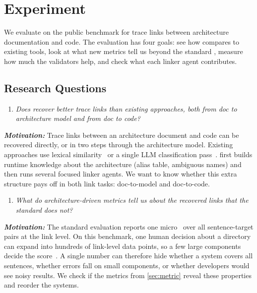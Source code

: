 \section{Experiment}
\label{sec:experiment}

We evaluate \approach{} on the public benchmark for trace links between architecture documentation and code.
The evaluation has four goals: see how \approach{} compares to existing tools, look at what new metrics tell us beyond the standard \fone, measure how much the validators help, and check what each linker agent contributes.

\subsection{Research Questions}
\label{sec:rqs}

\begin{enumerate}[leftmargin=*, labelindent=0em, label=\textbf{RQ\arabic*}:, ref=RQ\arabic*, series=researchQuestions]
    \item \label{RQ1 SOTA comparison} \emph{Does \approach{} recover better trace links than existing approaches, both from doc to architecture model and from doc to code?}
\end{enumerate}
\emph{\textbf{Motivation:}}
Trace links between an architecture document and code can be recovered directly, or in two steps through the architecture model.
Existing approaches use lexical similarity~\cite{swattr} or a single \ac{LLM} classification pass~\cite{lissa}.
\approach{} first builds runtime knowledge about the architecture (alias table, ambiguous names) and then runs several focused linker agents.
We want to know whether this extra structure pays off in both link tasks: doc-to-model and doc-to-code.

\begin{enumerate}[leftmargin=*, labelindent=0em, label=\textbf{RQ\arabic*}:, ref=RQ\arabic*, series=researchQuestions, resume]
    \item \label{RQ2 metrics} \emph{What do architecture-driven metrics tell us about the recovered links that the standard \fone does not?}
\end{enumerate}
\emph{\textbf{Motivation:}}
The standard evaluation reports one micro \fone\ over all sentence-target pairs at the link level.
On this benchmark, one human decision about a directory can expand into hundreds of link-level data points, so a few large components decide the score~\cite{replication}.
A single number can therefore hide whether a system covers all sentences, whether errors fall on small components, or whether developers would see noisy results.
We check if the metrics from \autoref{sec:metric} reveal these properties and reorder the systems.

